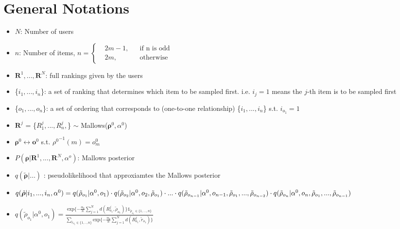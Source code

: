 \documentclass[11pt, oneside]{article}   	%
\title{}
\author{}
\date{}							%
\begin{document}
\maketitle
\section{General Notations}

\begin{itemize}

	\item {$N$: Number of users}
	
	\item {$n$: Number of items,    $
	n = \left \{
	\begin{aligned}
	&2m-1, && \text{if n is odd} \\
	&2m, && \text{otherwise}
	\end{aligned} \right.
	$}
	
	\item {$\bm{R}^1,...,\bm{R}^N$: full rankings given by the users}
	
	\item{\{$i_1, ..., i_n$\}: a set of ranking that determines which item to be sampled first. i.e. $i_j = 1$ means the $j$-th item is to be sampled first}
	\item{ \{$o_1, ..., o_n$\}: a set of ordering that corresponds to (one-to-one relationship) \{$i_1, ..., i_n$\} s.t. $i_{o_1} = 1$ }
	
	
	\item {$\bm{R}^j$ = \{$R^j_1,...,R^j_n,$\} $\sim$ Mallows($\bm{\rho}^0, \alpha^0$)}
	\item{ $\bm{\rho}^0 \leftrightarrow \bm{o}^0$ s.t. ${{\rho}^0}^{-1}(m) = o^0_m$}
	
	\item {$P(\bm{\rho}|\bm{R}^1,...,\bm{R}^N,\alpha^o)$: Mallows posterior}
	
	\item {$q(\tilde{\bm{\rho}}|\dots)$ : pseudolikelihood that approxiamtes the Mallows posterior}
	\item {$q(\tilde{\bm{\rho}}|i_1, ..., i_n, \alpha^0) \\
		=q(\tilde{\rho}_{o_1}|\alpha^0,o_1) \cdot
		q(\tilde{\rho}_{o_2}|\alpha^0,o_2, \tilde{\rho}_{o_1}) \cdot
		... \cdot
		q(\tilde{\rho}_{o_{n-1}}|\alpha^0,o_{n-1}, \tilde{\rho}_{o_1},...,\tilde{\rho}_{o_{n-2}}) \cdot
		q(\tilde{\rho}_{o_{n}}|\alpha^0,o_{n}, \tilde{\rho}_{o_1},...,\tilde{\rho}_{o_{n-1}})$}
	\item{	$ {q(\tilde{\rho}_{o_1}|\alpha^0, o_1) }
		= \frac{\text{exp}\{- \frac{\alpha_0}{n}\sum\limits_{j=1}^{N}d(R^j_{o_1}, \tilde{\rho}_{o_1})\}\mathbb{1}_{\tilde{\rho}_{o_1}\in \{1, ...,n\}}}
		{\sum\limits_{\tilde{r}_{o_1}\in \{1, .., n\}}\text{exp}\{- \frac{\alpha_0}{n}\sum\limits_{j=1}^{N}d(R^j_{o_1}, \tilde{r}_{o_1})\}} $}
	

\end{itemize}
\end{document}
